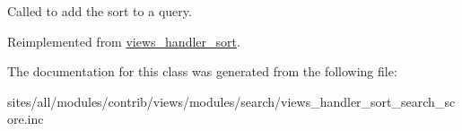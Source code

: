 Called to add the sort to a query. 

Reimplemented from \hyperlink{classviews__handler__sort_94fa33c5d037e41a927583fce2df3d18}{views\_\-handler\_\-sort}.

The documentation for this class was generated from the following file:\begin{CompactItemize}
\item 
sites/all/modules/contrib/views/modules/search/views\_\-handler\_\-sort\_\-search\_\-score.inc\end{CompactItemize}
